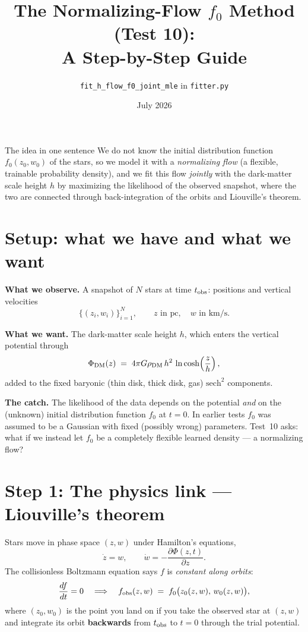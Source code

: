 \documentclass[11pt]{article}
\title{The Normalizing-Flow $f_0$ Method (Test 10):\\ A Step-by-Step Guide}
\author{\texttt{fit\_h\_flow\_f0\_joint\_mle} in \texttt{fitter.py}}
\date{July 2026}
\begin{document}
\maketitle

\begin{keybox}{The idea in one sentence}
We do not know the initial distribution function $f_0(z_0,w_0)$ of the stars, so we
model it with a \emph{normalizing flow} (a flexible, trainable probability density),
and we fit this flow \emph{jointly} with the dark-matter scale height $h$ by maximizing
the likelihood of the observed snapshot, where the two are connected through
back-integration of the orbits and Liouville's theorem.
\end{keybox}

\tableofcontents

\section{Setup: what we have and what we want}

\textbf{What we observe.} A snapshot of $N$ stars at time $t_{\rm obs}$:
positions and vertical velocities
\[
\{(z_i, w_i)\}_{i=1}^{N}, \qquad z \text{ in pc},\quad w \text{ in km/s}.
\]

\textbf{What we want.} The dark-matter scale height $h$, which enters the vertical
potential through
\[
\Phi_{\rm DM}(z) \;=\; 4\pi G \rho_{\rm DM}\, h^2 \,\ln\cosh\!\left(\frac{z}{h}\right),
\]
added to the fixed baryonic (thin disk, thick disk, gas) $\mathrm{sech}^2$ components.

\textbf{The catch.} The likelihood of the data depends on the potential \emph{and} on
the (unknown) initial distribution function $f_0$ at $t=0$. In earlier tests $f_0$ was
assumed to be a Gaussian with fixed (possibly wrong) parameters. Test~10 asks: what if
we instead let $f_0$ be a completely flexible learned density --- a normalizing flow?

\section{Step 1: The physics link --- Liouville's theorem}

Stars move in phase space $(z,w)$ under Hamilton's equations,
\[
\dot z = w, \qquad \dot w = -\frac{\partial \Phi(z,t)}{\partial z}.
\]
The collisionless Boltzmann equation says $f$ is \emph{constant along orbits}:
\[
\frac{df}{dt}=0
\quad\Longrightarrow\quad
f_{\rm obs}(z,w) \;=\; f_0\bigl(z_0(z,w),\, w_0(z,w)\bigr),
\]
where $(z_0, w_0)$ is the point you land on if you take the observed star at
$(z,w)$ and integrate its orbit \textbf{backwards} from $t_{\rm obs}$ to $t=0$
through the trial potential.
\end{document}

